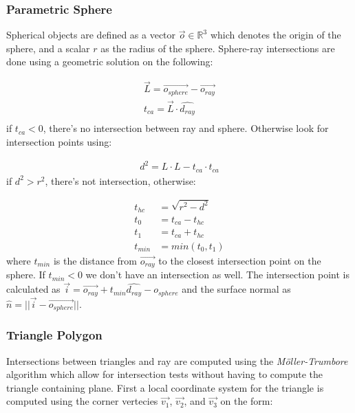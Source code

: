 \documentclass[a4paper, twocolumn]{article}
\begin{document}
        \subsubsection{Parametric Sphere} \label{sec:parametric_sphere}
        
        Spherical objects are defined as a vector \(\vec{o} \in \mathbb{R}^3\) which denotes the origin of the sphere, and a scalar \(r\) as the radius of the sphere. Sphere-ray intersections are done using a geometric solution on the following:

        \begin{align*}
            \vec{L} = \vec{o_{sphere}} - \vec{o_{ray}} \\
            t_{ca} = \vec{L} \cdot  \hat{d_{ray}} \\
        \end{align*}
        if \(t_{ca} < 0\), there's no intersection between ray and sphere. Otherwise look for intersection points using:
        
        \begin{align*}
            d^2 = L \cdot L - t_{ca} \cdot t_{ca}
        \end{align*}
        if \(d^2 > r^2\), there's not intersection, otherwise:

        \begin{align*}
            t_{hc} &= \sqrt{r^2 - d^2} \\
            t_0 &= t_{ca} - t_{hc} \\
            t_1 &= t_{ca} + t_{hc} \\
            t_{min} &= min(t_0, t_1)
        \end{align*}
        where \(t_{min}\) is the distance from \(\vec{o_{ray}}\) to the closest intersection point on the sphere. If \(t_{min}  < 0\) we don't have an intersection as well. The intersection point is calculated as  \(\vec{i} = \vec{o_{ray}} + t_{min} \hat{d_{ray}} - o_{sphere} \) and the surface normal as \( \hat{n} = || \vec{i} - \vec{o_{sphere}} || \).

        \subsubsection{Triangle Polygon} \label{sec:triangle_polygon}
        
        Intersections between triangles and ray are computed using the \textit{Möller-Trumbore}~\cite{moller2005fast} algorithm which allow for intersection tests without having to compute the triangle containing plane. First a local coordinate system for the triangle is computed using the corner vertecies \(\vec{v_1}\), \(\vec{v_2}\), and \(\vec{v_3}\) on the form:
\end{document}
